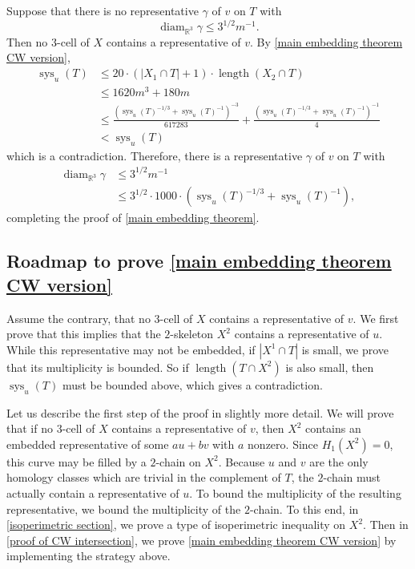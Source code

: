\documentclass[12pt]{amsart}
\DeclareMathOperator*{\diam}{diam}
\DeclareMathOperator*{\length}{length}
\DeclareMathOperator*{\sys}{sys}
\theoremstyle{definition}
\begin{document}
Suppose that there is no representative $\gamma$ of $v$ on $T$ with $$\textstyle\diam_{\mathbb{R}^3}\gamma\leq 3^{1/2}m^{-1}.$$ Then no $3$-cell of $X$ contains a representative of $v$. By \cref{main embedding theorem CW version}, 
\begin{align*}\textstyle\sys_u(T)&\leq 20\cdot (|X_1\cap T|+1)\cdot \length(X_2\cap T)\\&\leq 1620m^3+180m \\& \leq  \frac{(\sys_u(T)^{-1/3}+\sys_u(T)^{-1})^{-3}}{617283}+\frac{(\sys_u(T)^{-1/3}+\sys_u(T)^{-1})^{-1}}{4}\\&<\textstyle\sys_u(T)
\end{align*}
which is a contradiction. Therefore, there is a representative $\gamma$ of $v$ on $T$ with \begin{align*}\textstyle\diam_{\mathbb{R}^3}\gamma &\leq 3^{1/2}m^{-1}\\&\leq 3^{1/2}\cdot 1000\cdot \textstyle(\sys_u(T)^{-1/3}+\sys_u(T)^{-1}),
\end{align*}
completing the proof of \cref{main embedding theorem}.

\subsection{Roadmap to prove \cref{main embedding theorem CW version}} \label{technical overview of proof of main theorem} Assume the contrary, that no $3$-cell of $X$ contains a representative of $v$. We first prove that this implies that the $2$-skeleton $X^2$ contains a representative of $u$. While this representative may not be embedded, if $|X^1\cap T|$ is small, we prove that its multiplicity is bounded. So if $\length(T\cap X^2)$ is also small, then $\sys_u(T)$ must be bounded above, which gives a contradiction. 

Let us describe the first step of the proof in slightly more detail. We will prove that if no $3$-cell of $X$ contains a representative of $v$, then $X^2$ contains an embedded representative of some $au+bv$ with $a$ nonzero. Since $H_1(X^2)=0$, this curve may be filled by a $2$-chain on $X^2$. Because $u$ and $v$ are the only homology classes which are trivial in the complement of $T$, the $2$-chain must actually contain a representative of $u$. To bound the multiplicity of the resulting representative, we bound the multiplicity of the $2$-chain. To this end, in \cref{isoperimetric section}, we prove a type of isoperimetric inequality on $X^2$. Then in \cref{proof of CW intersection}, we prove \cref{main embedding theorem CW version} by implementing the strategy above. 
\end{document}
